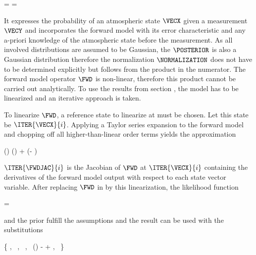     \startformula
        \POSTERIOR
        = \frac{\LIKELIHOOD \PRIOR}{\NORMALIZATION}
        = \frac{\GAUSS{\VECY}{\FWD(\VECX) + \MEANVECERR}{\COVMATERR}
            ~\GAUSS{\VECX}{\MEANVECA}{\COVMATA}}{\NORMALIZATION} \EQSTOP
    \stopformula

    It expresses the probability of an atmospheric state $\VECX$ given a
    measurement $\VECY$ and incorporates the forward model with its error
    characteristic and any a-priori knowledge of the atmospheric state before
    the measurement. As all involved distributions are assumed to be Gaussian,
    the $\POSTERIOR$ is also a Gaussian distribution therefore the
    normalization $\NORMALIZATION$ does not have to be determined explicitly
    but follows from the product in the numerator. The forward model operator
    $\FWD$ is non-linear, therefore this product cannot be carried out
    analytically. To use the results from section , the
    model has to be linearized and an iterative approach is taken.

\startsubsection[title=Iterative Solutions]

    To linearize $\FWD$, a reference state to linearize at must be chosen.
    Let this state be $\ITER{\VECX}{i}$. Applying a Taylor series
    expansion to the forward model and chopping off all higher-than-linear
    order terms yields the approximation

    \startformula
        \FWD(\VECX) \approx \FWD()
            +  (\VECX - ) \EQSTOP
    \stopformula

    $\ITER{\FWDJAC}{i}$ is the Jacobian of $\FWD$ at $\ITER{\VECX}{i}$
    containing the derivatives of the forward model output with respect to each
    state vector variable. After replacing $\FWD$ in
     by this linearization, the likelihood function

    \startformula
        \LIKELIHOOD = 
    \stopformula

    and the prior  fulfill the assumptions
     and the result  can be used with
    the substitutions

    \startformula
        \{ \VECA \rightarrow \MEANVECA,~
        \MATPI \rightarrow \COVMATA,~
        \MATB \rightarrow {},~
        \VECB \rightarrow \FWD()
            -  
            + \MEANVECERR,~
        \MATQI \rightarrow \COVMATERR \}
    \stopformula

